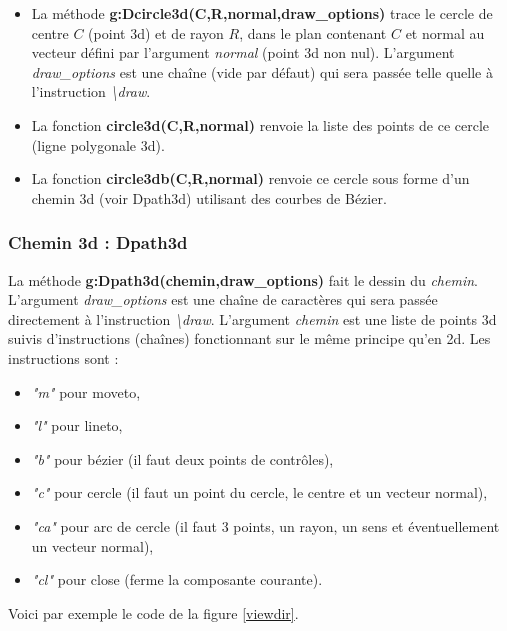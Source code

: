 \begin{itemize}
    \item La méthode \textbf{g:Dcircle3d(C,R,normal,draw\_options)} trace le cercle de centre $C$ (point 3d) et de rayon $R$, dans le plan contenant $C$ et normal au vecteur défini par l'argument \emph{normal} (point 3d non nul). L'argument \emph{draw\_options} est une chaîne (vide par défaut) qui sera passée telle quelle à l'instruction \emph{\textbackslash draw}.
    
    \item La fonction \textbf{circle3d(C,R,normal)} renvoie la liste des points de ce cercle (ligne polygonale 3d). 
    
    \item La fonction \textbf{circle3db(C,R,normal)} renvoie ce cercle sous forme d'un chemin 3d (voir Dpath3d) utilisant des courbes de Bézier.
\end{itemize}
    
\subsubsection{Chemin 3d : Dpath3d}

La méthode \textbf{g:Dpath3d(chemin,draw\_options)} fait le dessin du \emph{chemin}. L'argument \emph{draw\_options} est une chaîne de caractères qui sera passée directement à l'instruction \emph{\textbackslash draw}. L'argument \emph{chemin} est une liste de points 3d suivis d'instructions (chaînes) fonctionnant sur le même principe qu'en 2d. Les instructions sont :
    \begin{itemize}
      \item \emph{"m"} pour moveto,
      \item \emph{"l"} pour lineto,
      \item \emph{"b"} pour bézier (il faut deux points de contrôles),
      \item \emph{"c"} pour cercle (il faut un point du cercle, le centre et un vecteur normal),
      \item \emph{"ca"} pour arc de cercle (il faut 3 points, un rayon, un sens et éventuellement un vecteur normal),
      \item \emph{"cl"} pour close (ferme la composante courante).
      \end{itemize}

Voici par exemple le code de la figure \ref{viewdir}.

